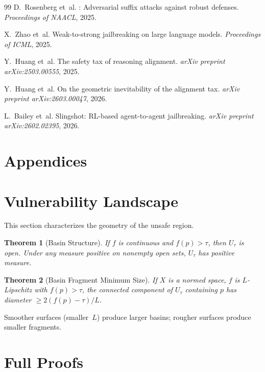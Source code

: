 \documentclass[11pt]{article}
\newtheorem{theorem}{Theorem}[section]
\begin{document}
\begin{thebibliography}{99}
D.~Rosenberg et~al.
: Adversarial suffix attacks against robust defenses.
\newblock \emph{Proceedings of NAACL}, 2025.

X.~Zhao et~al.
\newblock Weak-to-strong jailbreaking on large language models.
\newblock \emph{Proceedings of ICML}, 2025.

Y.~Huang et~al.
\newblock The safety tax of reasoning alignment.
\newblock \emph{arXiv preprint arXiv:2503.00555}, 2025.

Y.~Huang et~al.
\newblock On the geometric inevitability of the alignment tax.
\newblock \emph{arXiv preprint arXiv:2603.00047}, 2026.

L.~Bailey et~al.
\newblock Slingshot: {RL}-based agent-to-agent jailbreaking.
\newblock \emph{arXiv preprint arXiv:2602.02395}, 2026.

\end{thebibliography}


\newpage
\appendix
\section*{Appendices}

\section{Vulnerability Landscape}
\label{app:landscape}

This section characterizes the geometry of the unsafe region.

\begin{theorem}[Basin Structure]
\label{thm:basin}
If $f$ is continuous and $f(p)>\tau$, then $U_\tau$ is open. Under
any measure positive on nonempty open sets, $U_\tau$ has positive
measure.
\end{theorem}

\begin{theorem}[Basin Fragment Minimum Size]
\label{thm:fragment}
If $X$ is a normed space, $f$ is $L$-Lipschitz with $f(p) > \tau$,
the connected component of $U_\tau$ containing $p$ has diameter
$\geq 2(f(p) - \tau)/L$.
\end{theorem}

Smoother surfaces (smaller~$L$) produce larger basins; rougher
surfaces produce smaller fragments.

\section{Full Proofs}
\label{app:proofs}
\end{document}

